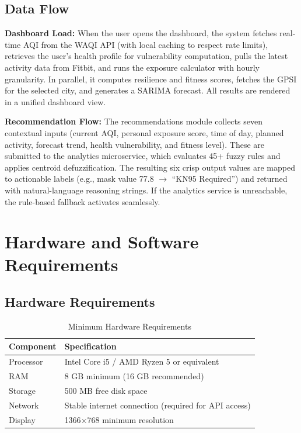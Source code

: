 \documentclass[12pt,a4paper]{report}
\begin{document}
\section{Data Flow}

\textbf{Dashboard Load:} When the user opens the dashboard, the system fetches real-time AQI from the WAQI API (with local caching to respect rate limits), retrieves the user's health profile for vulnerability computation, pulls the latest activity data from Fitbit, and runs the exposure calculator with hourly granularity. In parallel, it computes resilience and fitness scores, fetches the GPSI for the selected city, and generates a SARIMA forecast. All results are rendered in a unified dashboard view.

\textbf{Recommendation Flow:} The recommendations module collects seven contextual inputs (current AQI, personal exposure score, time of day, planned activity, forecast trend, health vulnerability, and fitness level). These are submitted to the analytics microservice, which evaluates 45+ fuzzy rules and applies centroid defuzzification. The resulting six crisp output values are mapped to actionable labels (e.g., mask value 77.8 $\rightarrow$ ``KN95 Required'') and returned with natural-language reasoning strings. If the analytics service is unreachable, the rule-based fallback activates seamlessly.


\chapter{Hardware and Software Requirements}

\section{Hardware Requirements}

\begin{table}[H]
\centering
\caption{Minimum Hardware Requirements}
\label{tab:hardware}
\begin{tabular}{ll}
\toprule
\textbf{Component} & \textbf{Specification} \\
\midrule
Processor       & Intel Core i5 / AMD Ryzen 5 or equivalent \\
RAM             & 8 GB minimum (16 GB recommended) \\
Storage         & 500 MB free disk space \\
Network         & Stable internet connection (required for API access) \\
Display         & 1366$\times$768 minimum resolution \\
\bottomrule
\end{tabular}
\end{table}
\end{document}
